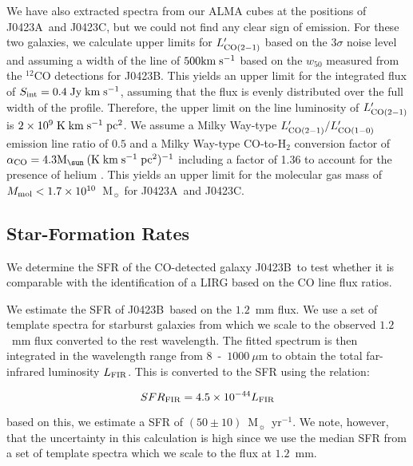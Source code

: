\documentclass[a4paper,fleqn,usenatbib]{mnras}
\newcommand{\GalA}{J0423A}
\newcommand{\GalB}{J0423B}
\newcommand{\GalC}{J0423C}
\begin{document}
We have also extracted spectra from our ALMA cubes at the positions of \GalA\ and \GalC, but we could not find any clear sign of emission. For these two galaxies, we calculate upper limits for $L'_{\rm CO(2-1)}$ based on the $3\sigma$ noise level and assuming a width of the line of $500 \rm{km\; s ^{-1}}$ based on the $w_{50}$ measured from the $^{12}$CO detections for \GalB. This yields an upper limit for the integrated flux of \mbox{$S_{\rm int} = 0.4 \rm{ \;Jy\;km\;s^{-1}}$}, assuming that the flux is evenly distributed over the full width of the profile. Therefore, the upper limit on the line luminosity of $L'_{\rm CO(2-1)}$ is $2 \times 10^{9}  \rm{\;K\;km\;s^{-1}\;pc^{2}}$. We assume a Milky Way-type $L'_{\rm CO(2-1)}/L'_{\rm CO(1-0)}$ emission line ratio of $0.5$ \citep{Carilli2013cool} and a Milky Way-type \mbox{CO-to-H$_2$} conversion factor of \mbox{$\alpha_{\rm CO} = 4.3  \rm{M}_{\sun}\:\rm{(K\;km\;s^{-1}\;pc^2)^{-1}}$} including a factor of 1.36 to account for the presence of helium  \mbox{\citep{Bolatto2013co}}. This yields an upper limit for the molecular gas mass of $M_{\rm mol}< 1.7\times 10^{10}$~M$_{\sun}$ for \GalA\ and \GalC.



\subsection{Star-Formation Rates}
\label{SubsecSFR}

We determine the SFR of the CO-detected galaxy \GalB\ to test whether it is comparable with the identification of a LIRG based on the CO line flux ratios.

We estimate the SFR of \GalB\ based on the $1.2$~mm flux. We use a set of template spectra for starburst galaxies from \citet{Polletta2007spectral} which we scale to the observed $1.2$~mm flux converted to the rest wavelength. The fitted spectrum is then integrated in the wavelength range from $8$~-~$1000 \:\mu \text{m}$ to obtain the total far-infrared luminosity $L_{\rm FIR}$. This is converted to the SFR using the \citet{Kennicutt1998starformation} relation:

\begin{equation}
SFR_{\rm FIR} = 4.5 \times 10^{-44} L_{\rm FIR}
\end{equation}

based on this, we estimate a SFR of \mbox{$(50 \pm 10)$~M$_{\sun}$~yr$^{-1}$}. We note, however, that the uncertainty in this calculation is high since we use the median SFR from a set of template spectra which we scale to the flux at $1.2$~mm.
\end{document}
